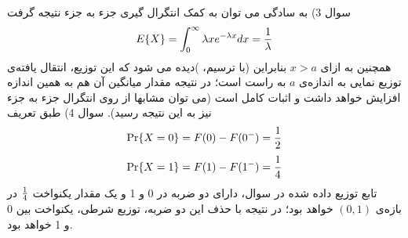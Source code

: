 \documentclass[10pt,letterpaper]{article}
\begin{document}
\newline\newline
سوال 3) به سادگی می توان به کمک انتگرال گیری جزء به جزء نتیجه گرفت
$$
E\{X\}=\int_0^\infty \lambda x e^{-\lambda x}dx={1\over \lambda}
$$
همچنین به ازای $x>a$
بنابراین
(با ترسیم، )دیده می شود که این توزیع، انتقال یافته‌ی توزیع نمایی به اندازه‌ی $a$ به راست است؛ در نتیجه مقدار میانگین آن هم به همین اندازه افزایش خواهد داشت و اثبات کامل است (می توان مشابها از روی انتگرال جزء به جزء نیز به این نتیجه رسید).
\newline\newline
سوال 4) طبق تعریف
$$
\Pr\{X=0\}=F(0)-F(0^-)={1\over 2}
$$
$$
\Pr\{X=1\}=F(1)-F(1^-)={1\over 4}
$$
تابع توزیع داده شده در سوال، دارای دو ضربه در 0 و 1 و یک مقدار یکنواخت $1\over 4$ در بازه‌ی $(0,1)$ خواهد بود؛ در نتیجه با حذف این دو ضربه، توزیع شرطی، یکنواخت بین 0 و 1 خواهد بود.
\end{document}
